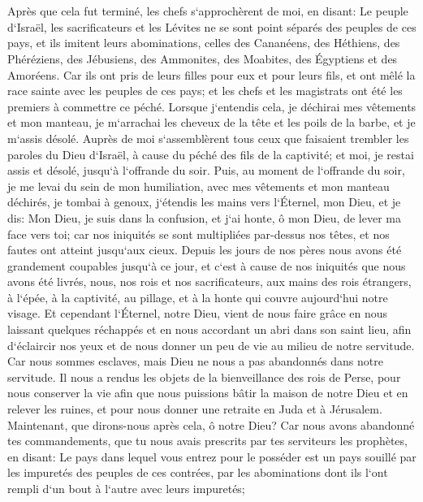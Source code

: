 \chapter{}

\verse Après que cela fut terminé, les chefs s`approchèrent de moi, en disant: Le peuple d`Israël, les sacrificateurs et les Lévites ne se sont point séparés des peuples de ces pays, et ils imitent leurs abominations, celles des Cananéens, des Héthiens, des Phéréziens, des Jébusiens, des Ammonites, des Moabites, des Égyptiens et des Amoréens. 
\verse Car ils ont pris de leurs filles pour eux et pour leurs fils, et ont mêlé la race sainte avec les peuples de ces pays; et les chefs et les magistrats ont été les premiers à commettre ce péché. 
\verse Lorsque j`entendis cela, je déchirai mes vêtements et mon manteau, je m`arrachai les cheveux de la tête et les poils de la barbe, et je m`assis désolé. 
\verse Auprès de moi s`assemblèrent tous ceux que faisaient trembler les paroles du Dieu d`Israël, à cause du péché des fils de la captivité; et moi, je restai assis et désolé, jusqu`à l`offrande du soir. 
\verse Puis, au moment de l`offrande du soir, je me levai du sein de mon humiliation, avec mes vêtements et mon manteau déchirés, je tombai à genoux, j`étendis les mains vers l`Éternel, mon Dieu, 
\verse et je dis: Mon Dieu, je suis dans la confusion, et j`ai honte, ô mon Dieu, de lever ma face vers toi; car nos iniquités se sont multipliées par-dessus nos têtes, et nos fautes ont atteint jusqu`aux cieux. 
\verse Depuis les jours de nos pères nous avons été grandement coupables jusqu`à ce jour, et c`est à cause de nos iniquités que nous avons été livrés, nous, nos rois et nos sacrificateurs, aux mains des rois étrangers, à l`épée, à la captivité, au pillage, et à la honte qui couvre aujourd`hui notre visage. 
\verse Et cependant l`Éternel, notre Dieu, vient de nous faire grâce en nous laissant quelques réchappés et en nous accordant un abri dans son saint lieu, afin d`éclaircir nos yeux et de nous donner un peu de vie au milieu de notre servitude. 
\verse Car nous sommes esclaves, mais Dieu ne nous a pas abandonnés dans notre servitude. Il nous a rendus les objets de la bienveillance des rois de Perse, pour nous conserver la vie afin que nous puissions bâtir la maison de notre Dieu et en relever les ruines, et pour nous donner une retraite en Juda et à Jérusalem. 
\verse Maintenant, que dirons-nous après cela, ô notre Dieu? Car nous avons abandonné tes commandements, 
\verse que tu nous avais prescrits par tes serviteurs les prophètes, en disant: Le pays dans lequel vous entrez pour le posséder est un pays souillé par les impuretés des peuples de ces contrées, par les abominations dont ils l`ont rempli d`un bout à l`autre avec leurs impuretés; 
